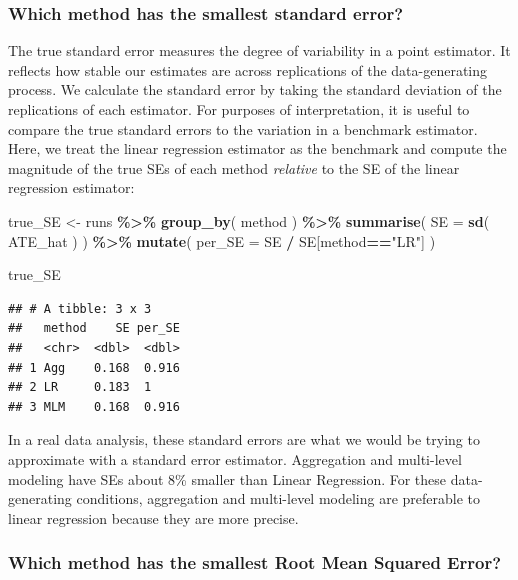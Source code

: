 \documentclass[
]{book}
\newenvironment{Shaded}{\begin{snugshade}}{\end{snugshade}}
\newcommand{\AttributeTok}[1]{\textcolor[rgb]{0.13,0.29,0.53}{#1}}
\newcommand{\FunctionTok}[1]{\textcolor[rgb]{0.13,0.29,0.53}{\textbf{#1}}}
\newcommand{\NormalTok}[1]{#1}
\newcommand{\OtherTok}[1]{\textcolor[rgb]{0.56,0.35,0.01}{#1}}
\newcommand{\SpecialCharTok}[1]{\textcolor[rgb]{0.81,0.36,0.00}{\textbf{#1}}}
\newcommand{\StringTok}[1]{\textcolor[rgb]{0.31,0.60,0.02}{#1}}
\begin{document}
\subsubsection*{Which method has the smallest standard error?}\label{which-method-has-the-smallest-standard-error}

The true standard error measures the degree of variability in a point estimator.
It reflects how stable our estimates are across replications of the data-generating process.
We calculate the standard error by taking the standard deviation of the replications of each estimator.
For purposes of interpretation, it is useful to compare the true standard errors to the variation in a benchmark estimator.
Here, we treat the linear regression estimator as the benchmark and compute the magnitude of the true SEs of each method \emph{relative} to the SE of the linear regression estimator:

\begin{Shaded}
\begin{Highlighting}[]
\NormalTok{true\_SE }\OtherTok{\textless{}{-}} 
\NormalTok{  runs }\SpecialCharTok{\%\textgreater{}\%} 
  \FunctionTok{group\_by}\NormalTok{( method ) }\SpecialCharTok{\%\textgreater{}\%}
  \FunctionTok{summarise}\NormalTok{( }\AttributeTok{SE =} \FunctionTok{sd}\NormalTok{( ATE\_hat ) ) }\SpecialCharTok{\%\textgreater{}\%}
  \FunctionTok{mutate}\NormalTok{( }\AttributeTok{per\_SE =}\NormalTok{ SE }\SpecialCharTok{/}\NormalTok{ SE[method}\SpecialCharTok{==}\StringTok{"LR"}\NormalTok{] )}

\NormalTok{true\_SE}
\end{Highlighting}
\end{Shaded}

\begin{verbatim}
## # A tibble: 3 x 3
##   method    SE per_SE
##   <chr>  <dbl>  <dbl>
## 1 Agg    0.168  0.916
## 2 LR     0.183  1    
## 3 MLM    0.168  0.916
\end{verbatim}

In a real data analysis, these standard errors are what we would be trying to approximate with a standard error estimator.
Aggregation and multi-level modeling have SEs about 8\% smaller than Linear Regression.
For these data-generating conditions, aggregation and multi-level modeling are preferable to linear regression because they are more precise.

\subsubsection*{Which method has the smallest Root Mean Squared Error?}\label{which-method-has-the-smallest-root-mean-squared-error}
\end{document}

